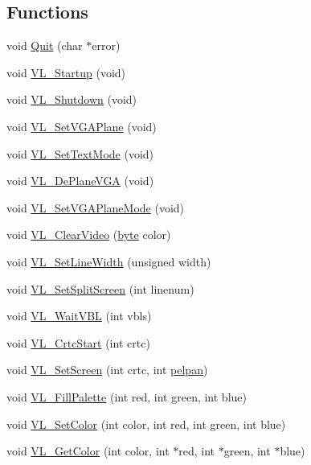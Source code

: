 \subsection*{Functions}
\begin{DoxyCompactItemize}
\item 
void \hyperlink{ID__VL_8H_a66ba47a93e3e25204f4d72aee7614201}{Quit} (char $\ast$error)
\item 
void \hyperlink{ID__VL_8H_aa10dcb97ab8ddbe00ceff643af423bef}{VL\_\-Startup} (void)
\item 
void \hyperlink{ID__VL_8H_a138484024a3c6a70dd3f3fc8b0774aa9}{VL\_\-Shutdown} (void)
\item 
void \hyperlink{ID__VL_8H_a7c33f4c169dd1e9c3fc1b8b3e82e431e}{VL\_\-SetVGAPlane} (void)
\item 
void \hyperlink{ID__VL_8H_a709f71c569d3ac193681be08c072085b}{VL\_\-SetTextMode} (void)
\item 
void \hyperlink{ID__VL_8H_a324bc865f0f44dda58c10ada4eae8bb5}{VL\_\-DePlaneVGA} (void)
\item 
void \hyperlink{ID__VL_8H_a49a6717be931b39c40a299c8e6383d82}{VL\_\-SetVGAPlaneMode} (void)
\item 
void \hyperlink{ID__VL_8H_a82e5109ec5af48b755563a47b8760160}{VL\_\-ClearVideo} (\hyperlink{ID__HEAD_8H_a0c8186d9b9b7880309c27230bbb5e69d}{byte} color)
\item 
void \hyperlink{ID__VL_8H_ae6999c2347a63aecb0d5b773727233e4}{VL\_\-SetLineWidth} (unsigned width)
\item 
void \hyperlink{ID__VL_8H_aead87cc222e7ecc11ed285babd9df96f}{VL\_\-SetSplitScreen} (int linenum)
\item 
void \hyperlink{ID__VL_8H_ab76cfea15c66ecd888aa773a7b5ec300}{VL\_\-WaitVBL} (int vbls)
\item 
void \hyperlink{ID__VL_8H_a37a5d36d3436a340a0f44102b3b5c435}{VL\_\-CrtcStart} (int crtc)
\item 
void \hyperlink{ID__VL_8H_a3de4b44b45163a1efd172c1ac4153a56}{VL\_\-SetScreen} (int crtc, int \hyperlink{ID__VL_8H_a868e53c86d5ef1ddae46b80290a36cd8}{pelpan})
\item 
void \hyperlink{ID__VL_8H_a5b35f17b2827ed46e5527e980de6522d}{VL\_\-FillPalette} (int red, int green, int blue)
\item 
void \hyperlink{ID__VL_8H_a58b95eb8953ab9a02185e8fec86ca80e}{VL\_\-SetColor} (int color, int red, int green, int blue)
\item 
void \hyperlink{ID__VL_8H_aac86ea12ff7436142d995dd219146b7a}{VL\_\-GetColor} (int color, int $\ast$red, int $\ast$green, int $\ast$blue)

\end{DoxyCompactItemize}
